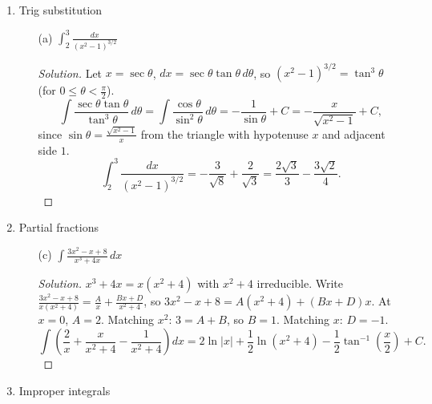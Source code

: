 \documentclass[12pt]{article}
\newenvironment{solution}
  {\renewcommand\qedsymbol{$\blacksquare$}\begin{proof}[Solution]}
  {\end{proof}}
\begin{document}
\begin{enumerate}
\begin{enumerate}
\item[(c)] $\int\tan^2(x)\sec^4(x)\,dx$
\begin{solution}
The power of $\sec$ is even, so save $\sec^2x$ and convert the other $\sec^2x=1+\tan^2x$. Let $u=\tan x$, $du=\sec^2x\,dx$.
\[ \int\tan^2x(1+\tan^2x)\sec^2x\,dx=\int(u^2+u^4)\,du=\frac{\tan^3x}{3}+\frac{\tan^5x}{5}+C. \]
\end{solution}



\end{enumerate}

\setcounter{enumi}{10}
\item Trig substitution
\begin{enumerate}
\item[(a)] $\int_2^3\frac{dx}{(x^2-1)^{3/2}}$
\begin{solution}
Let $x=\sec\theta$, $dx=\sec\theta\tan\theta\,d\theta$, so $(x^2-1)^{3/2}=\tan^3\theta$ (for $0\le\theta<\frac{\pi}{2}$).
\[ \int\frac{\sec\theta\tan\theta}{\tan^3\theta}\,d\theta=\int\frac{\cos\theta}{\sin^2\theta}\,d\theta=-\frac{1}{\sin\theta}+C=-\frac{x}{\sqrt{x^2-1}}+C, \]
since $\sin\theta=\frac{\sqrt{x^2-1}}{x}$ from the triangle with hypotenuse $x$ and adjacent side $1$.
\[ \int_2^3\frac{dx}{(x^2-1)^{3/2}}=-\frac{3}{\sqrt8}+\frac{2}{\sqrt3}=\frac{2\sqrt3}{3}-\frac{3\sqrt2}{4}. \]
\end{solution}





\end{enumerate}

\setcounter{enumi}{11}
\item Partial fractions
\begin{enumerate}


\item[(c)] $\int\frac{3x^2-x+8}{x^3+4x}\,dx$
\begin{solution}
$x^3+4x=x(x^2+4)$ with $x^2+4$ irreducible. Write $\frac{3x^2-x+8}{x(x^2+4)}=\frac Ax+\frac{Bx+D}{x^2+4}$, so $3x^2-x+8=A(x^2+4)+(Bx+D)x$. At $x=0$, $A=2$. Matching $x^2$: $3=A+B$, so $B=1$. Matching $x$: $D=-1$.
\[ \int\left(\frac2x+\frac{x}{x^2+4}-\frac{1}{x^2+4}\right)dx=2\ln|x|+\frac12\ln(x^2+4)-\frac12\tan^{-1}\left(\frac x2\right)+C. \]
\end{solution}


\end{enumerate}

\setcounter{enumi}{12}
\item Improper integrals
\begin{enumerate}




\end{enumerate}
\end{enumerate}
\end{document}

